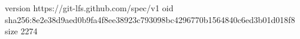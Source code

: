 version https://git-lfs.github.com/spec/v1
oid sha256:8e2e38d9aed0b9fa4f8ee38923c793098bc4296770b1564840c6ed3b01d018f8
size 2274

